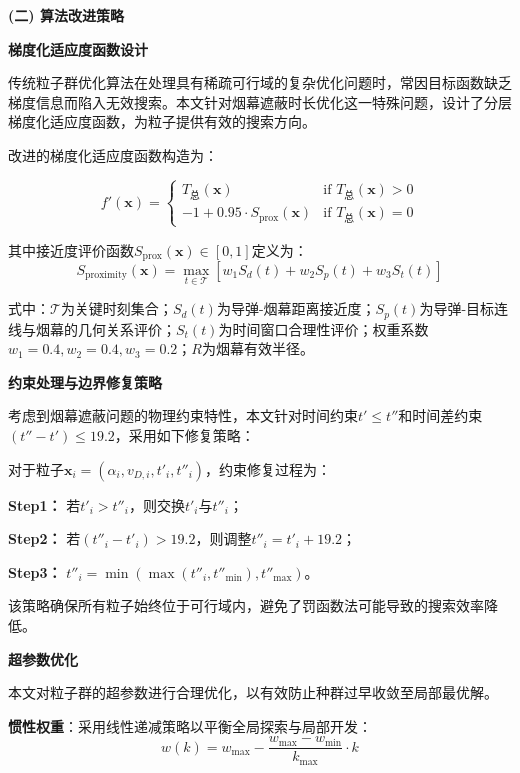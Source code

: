 \documentclass[withoutpreface,bwprint]{cumcmthesis}
\numberwithin{equation}{section} %
\numberwithin{figure}{section} %
\numberwithin{table}{section}  %
\newcommand*\circled[2]{\tikz[baseline=(char.base)]{\node[shape=circle,draw,inner sep=1.5pt] (char) {#1#2};}} %
\begin{document}
\textbf{(二) 算法改进策略}

\vspace{1em}

\circled{\large}{1} \textbf{梯度化适应度函数设计}

传统粒子群优化算法在处理具有稀疏可行域的复杂优化问题时，常因目标函数缺乏梯度信息而陷入无效搜索。本文针对烟幕遮蔽时长优化这一特殊问题，设计了分层梯度化适应度函数，为粒子提供有效的搜索方向。

改进的梯度化适应度函数构造为：

$$f'(\boldsymbol{x}) = \begin{cases}
T_{\text{总}}(\boldsymbol{x}) & \text{if } T_{\text{总}}(\boldsymbol{x}) > 0 \\
-1 + 0.95 \cdot S_{\text{prox}}(\boldsymbol{x}) & \text{if } T_{\text{总}}(\boldsymbol{x}) = 0
\end{cases}$$

其中接近度评价函数$S_{\text{prox}}(\boldsymbol{x}) \in [0,1]$定义为：
$$S_{\text{proximity}}(\boldsymbol{x}) = \max_{t \in \mathcal{T}} \left[ w_1 S_d(t) + w_2 S_p(t) + w_3 S_t(t) \right]$$

式中：$\mathcal{T}$为关键时刻集合；$S_d(t)$为导弹-烟幕距离接近度；$S_p(t)$为导弹-目标连线与烟幕的几何关系评价；$S_t(t)$为时间窗口合理性评价；权重系数$w_1 = 0.4, w_2 = 0.4, w_3 = 0.2$；$R$为烟幕有效半径。

\vspace{1em}
\circled{\large}{2} \textbf{约束处理与边界修复策略}

考虑到烟幕遮蔽问题的物理约束特性，本文针对时间约束$t' \leq t''$和时间差约束$(t'' - t') \leq 19.2$，采用如下修复策略：

对于粒子$\boldsymbol{x}_i = (\alpha_i, v_{D,i}, t'_i, t''_i)$，约束修复过程为：

\textbf{Step1：} 若$t'_i > t''_i$，则交换$t'_i$与$t''_i$；

\textbf{Step2：} 若$(t''_i - t'_i) > 19.2$，则调整$t''_i = t'_i + 19.2$；

\textbf{Step3：} $t''_i = \min(\max(t''_i, t''_{\min}), t''_{\max})$。

该策略确保所有粒子始终位于可行域内，避免了罚函数法可能导致的搜索效率降低。

\vspace{1em}
\circled{\large}{3} \textbf{超参数优化}

本文对粒子群的超参数进行合理优化，以有效防止种群过早收敛至局部最优解。

\textbf{惯性权重}：采用线性递减策略以平衡全局探索与局部开发：
$$w(k) = w_{\max} - \frac{w_{\max} - w_{\min}}{k_{\max}} \cdot k$$
\end{document}
